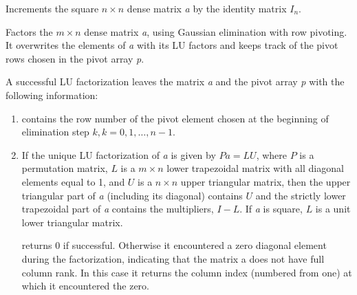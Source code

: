 \documentclass[letterpaper,10pt,english]{sphinxmanual}
\begin{document}

\begin{fulllineitems}
\label{linear_solvers/DLS:denseAddIdentity}
Increments the square $n \times n$ dense matrix \emph{a} by the
identity matrix $I_n$.

\end{fulllineitems}


\begin{fulllineitems}
Factors the $m \times n$ dense matrix \emph{a}, using Gaussian
elimination with row pivoting. It overwrites the elements of \emph{a}
with its LU factors and keeps track of the pivot rows chosen in the
pivot array \emph{p}.

A successful LU factorization leaves the matrix \emph{a} and the pivot
array \emph{p} with the following information:
\begin{enumerate}
\item {} 
 contains the row number of the pivot element chosen at
the beginning of elimination step $k, k = 0, 1, \ldots,
n-1$.

\item {} 
If the unique LU factorization of \emph{a} is given by $P a =
LU$, where $P$ is a permutation matrix, $L$ is a
$m \times n$ lower trapezoidal matrix with all diagonal
elements equal to 1, and $U$ is a $n \times n$ upper
triangular matrix, then the upper triangular part of \emph{a}
(including its diagonal) contains $U$ and the strictly
lower trapezoidal part of \emph{a} contains the multipliers,
$I-L$. If \emph{a} is square, $L$ is a unit lower
triangular matrix.

{\hyperref[linear_solvers/DLS:denseGETRF]{}} returns 0 if successful. Otherwise it
encountered a zero diagonal element during the factorization,
indicating that the matrix a does not have full column rank. In
this case it returns the column index (numbered from one) at
which it encountered the zero.

\end{enumerate}

\end{fulllineitems}

\end{document}

